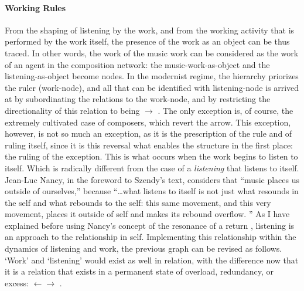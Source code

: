 \paragraph{Working Rules}
From the shaping of listening by the work, and from the working activity that is performed by the work itself, the presence of the work as an object can be thus traced. In other words, the work of the music work can be considered as the work of an agent in the composition network: the music-work-as-object and the listening-as-object become nodes. In the modernist regime, the hierarchy priorizes the ruler (work-node), and all that can be identified with listening-node is arrived at by subordinating the relations to the work-node, and by restricting the directionality of this relation to being  $\rightarrow$ . The only exception is, of course, the extremely cultivated case of composers, which revert the arrow. This exception, however, is not so much an exception, as it is the prescription of the rule and of ruling itself, since it is this reversal what enables the structure in the first place: the ruling of the exception. This is what occurs when the work begins to listen to itself. Which is radically different from the case of a \textit{listening} that listens to itself. Jean-Luc Nancy, in the foreword to Szendy's text, considers that ``music places us outside of ourselves,'' because ``\dots what listens to itself is not just what resounds in the self and what rebounds to the self: this same movement, and this very movement, places it outside of self and makes its rebound overflow. \parencite[xii]{Sze08:Lis}'' As I have explained before using Nancy's concept of the resonance of a return , listening is an approach to the relationship in self. Implementing this relationship within the dynamics of listening and work, the previous graph can be revised as follows. `Work' and `listening' would exist as well in relation, with the difference now that it is a relation that exists in a permanent state of overload, redundancy, or excess:  $\leftarrow\rightarrow$ . 


